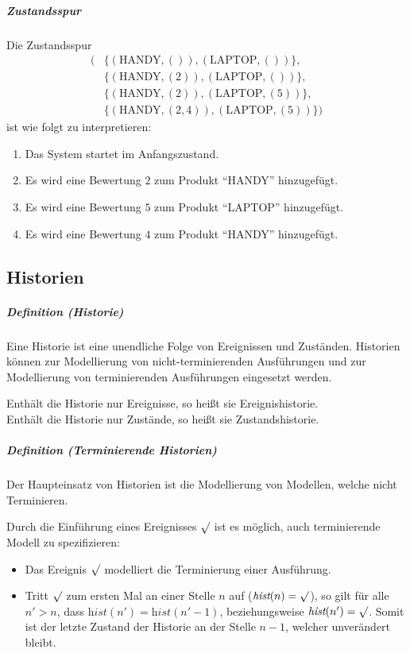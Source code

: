 \documentclass[a4paper, 11pt, accentcolor = tud3b]{tudreport}
\newcommand{\definition}[2]{\subparagraph{Definition (#1)} #2}
\begin{document}
				    \subparagraph{Zustandsspur}
					    Die Zustandsspur
					    \begin{align*}
						    ( & \{ (\text{HANDY}, ()), (\text{LAPTOP}, ()) \}, \\
						      & \{ (\text{HANDY}, (2)), (\text{LAPTOP}, ()) \}, \\
						      & \{ (\text{HANDY}, (2)), (\text{LAPTOP}, (5)) \}, \\
						      & \{ (\text{HANDY}, (2, 4)), (\text{LAPTOP}, (5)) \} )
					    \end{align*}
					    ist wie folgt zu interpretieren:
					    \begin{enumerate}
					    	\item Das System startet im Anfangszustand.
					    	\item Es wird eine Bewertung $ 2 $ zum Produkt \enquote{HANDY} hinzugefügt.
					    	\item Es wird eine Bewertung $ 5 $ zum Produkt \enquote{LAPTOP} hinzugefügt.
					    	\item Es wird eine Bewertung $ 4 $ zum Produkt \enquote{HANDY} hinzugefügt.
					    \end{enumerate}
		    
		    \subsection{Historien}
			    \definition{Historie}{
			    	Eine Historie ist eine unendliche Folge von Ereignissen und Zuständen. Historien können zur Modellierung von nicht-terminierenden Ausführungen und zur Modellierung von terminierenden Ausführungen eingesetzt werden.
			    	
			    	Enthält die Historie nur Ereignisse, so heißt sie Ereignishistorie. \\
			    	Enthält die Historie nur Zustände, so heißt sie Zustandshistorie.
			    }
			    
			    \definition{Terminierende Historien}{
			    	Der Haupteinsatz von Historien ist die Modellierung von Modellen, welche nicht Terminieren.
			    	
			    	Durch die Einführung eines Ereignisses $ \surd $ ist es möglich, auch terminierende Modell zu spezifizieren:
			    	\begin{itemize}
			    		\item Das Ereignis $ \surd $ modelliert die Terminierung einer Ausführung.
			    		\item Tritt $ \surd $ zum ersten Mal an einer Stelle $ n $ auf ($ \textit{hist}(n) = \surd $), so gilt für alle $ n' > n $, dass $ \textit{hist}(n') = \textit{hist}(n' - 1) $, beziehungsweise $ \textit{hist}(n') = \surd $. Somit ist der letzte Zustand der Historie an der Stelle $ n - 1 $, welcher unverändert bleibt.
			    	\end{itemize}
			    }
	    
\end{document}
